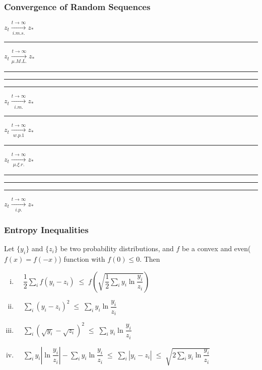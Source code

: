 \documentclass[UTF8,11pt,colorlinks,compress,openany]{beamer}%
\begin{document}
\begin{frame}\frametitle{Convergence of Random Sequences}
\begin{center}
		\begin{minipage}{45ex}
			\hspace{7.5ex}$z_t\xrightarrow[i.m.s.]{t\to\infty} z_*$
			\rule{3ex}{0ex}
			$z_t\xrightarrow[\mu.M.L.]{t\to\infty} z_*$
			\vspace{0.5ex}
			
			\rule{7ex}{0ex}%
			\rule{8ex}{0ex}%
			\rule{4ex}{0ex}\vspace{0ex}
			
			$z_t\xrightarrow[i.m.]{t\to\infty} z_*$
			\rule{3ex}{0ex}
			$z_t\xrightarrow[w.p.1]{t\to\infty} z_*$
			\rule{3ex}{0ex}
			$z_t\xrightarrow[\mu.\xi.r.]{t\to\infty} z_*$
			\vspace{0ex}
			
			\rule{7ex}{0ex}%
			\rule{8ex}{0ex}\vspace{0.5ex}
			
			\rule{7.5ex}{0ex}$z_t\xrightarrow[i.p.]{t\to\infty} z_*$
	\end{minipage}
\end{center}
\end{frame}

\begin{frame}\frametitle{Entropy Inequalities}
\begin{lemma}
Let $\{y_i\}$ and $\{z_i\}$ be two probability distributions, and $f$ be a convex and even($f(x)=f(-x)$) function with $f(0)\leq 0$. Then
\begin{enumerate}[(i).]
\item
 $\quad\displaystyle\dfrac{1}{2}\sum_i f(y_i\!-\!z_i) \;\leq\;
 f\left(\sqrt{\dfrac{1}{2}\sum_i y_i\ln\dfrac{y_i}{z_i}}\right)$
\item
 $\quad\displaystyle\sum_i (y_i\!-\!z_i)^2 \;\leq\; \sum_i y_i\ln\dfrac{y_i}{z_i}$
\item
 $\quad\displaystyle\sum_i (\sqrt{y_i}\!-\!\sqrt{z_i})^2 \;\leq\; \sum_i y_i\ln\dfrac{y_i}{z_i}$
\item
 $\quad\displaystyle\sum_i y_i\left|\ln\dfrac{y_i}{z_i}\right| - \sum_i y_i\ln\dfrac{y_i}{z_i} \;\leq\;
 \sum_i \left|y_i\!-\!z_i\right| \;\leq\; \sqrt{2\sum_i y_i\ln\dfrac{y_i}{z_i}}$
\end{enumerate}
\end{lemma}
\end{frame}
\end{document}
